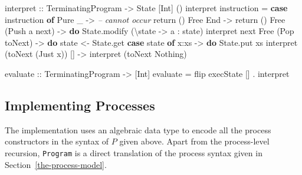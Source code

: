 \documentclass[runningheads,plain]{llncs}
\newenvironment{Shaded}{}{}
\newcommand{\KeywordTok}[1]{\textcolor[rgb]{0.00,0.44,0.13}{\textbf{#1}}}
\newcommand{\DataTypeTok}[1]{\textcolor[rgb]{0.56,0.13,0.00}{#1}}
\newcommand{\CommentTok}[1]{\textcolor[rgb]{0.38,0.63,0.69}{\textit{#1}}}
\newcommand{\OtherTok}[1]{\textcolor[rgb]{0.00,0.44,0.13}{#1}}
\newcommand{\FunctionTok}[1]{\textcolor[rgb]{0.02,0.16,0.49}{#1}}
\newcommand{\NormalTok}[1]{#1}
\begin{document}
\begin{Shaded}
\begin{Highlighting}[]
\OtherTok{interpret ::} \DataTypeTok{TerminatingProgram} \OtherTok{->} \DataTypeTok{State}\NormalTok{ [}\DataTypeTok{Int}\NormalTok{] () }
\NormalTok{interpret instruction }\FunctionTok{=} 
    \KeywordTok{case}\NormalTok{ instruction }\KeywordTok{of}
        \DataTypeTok{Pure}\NormalTok{ _ }\OtherTok{->} 
            \CommentTok{-- cannot occur}
\NormalTok{            return () }
        \DataTypeTok{Free} \DataTypeTok{End} \OtherTok{->} 
\NormalTok{            return () }
        \DataTypeTok{Free}\NormalTok{ (}\DataTypeTok{Push}\NormalTok{ a next) }\OtherTok{->} \KeywordTok{do} 
\NormalTok{            State.modify (\textbackslash{}state }\OtherTok{->}\NormalTok{ a }\FunctionTok{:}\NormalTok{ state)}
\NormalTok{            interpret next}
        \DataTypeTok{Free}\NormalTok{ (}\DataTypeTok{Pop}\NormalTok{ toNext) }\OtherTok{->} \KeywordTok{do}
\NormalTok{            state }\OtherTok{<-}\NormalTok{ State.get}
            \KeywordTok{case}\NormalTok{ state }\KeywordTok{of} 
\NormalTok{                x}\FunctionTok{:}\NormalTok{xs }\OtherTok{->} \KeywordTok{do}
\NormalTok{                    State.put xs}
\NormalTok{                    interpret (toNext (}\DataTypeTok{Just}\NormalTok{ x))}
\NormalTok{                [] }\OtherTok{->} 
\NormalTok{                    interpret (toNext }\DataTypeTok{Nothing}\NormalTok{)}

\OtherTok{evaluate ::} \DataTypeTok{TerminatingProgram} \OtherTok{->}\NormalTok{ [}\DataTypeTok{Int}\NormalTok{] }
\NormalTok{evaluate }\FunctionTok{=}\NormalTok{ flip execState [] }\FunctionTok{.}\NormalTok{ interpret }
\end{Highlighting}
\end{Shaded}


\subsection{Implementing Processes}
The implementation uses an algebraic data type %
to encode all the process constructors in the syntax of $P$ given above. 
Apart from the process-level recursion, \texttt{Program} is a direct translation of the process syntax given in Section~\ref{the-process-model}.
\end{document}
